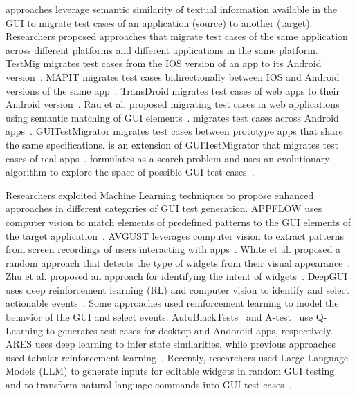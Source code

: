 \smallskip 
\testreuse approaches leverage semantic similarity of textual information available in the GUI to migrate test cases of an application (source) to another (target).
Researchers proposed approaches that migrate test cases of the same application across different platforms and different applications in the same platform. 
TestMig migrates test cases from the IOS version of an app to its Android version~\cite{Qin:testmig:ISSTA:2019}.
MAPIT migrates test cases bidirectionally between IOS and Android versions of the same app~\cite{talebipour:MAPIT:ASE:2021}.
TransDroid migrates test cases of web apps to their Android version~\cite{lin:TransDroid:ICST:2022}.
 Rau et al. proposed migrating test cases in web applications  using semantic matching of GUI elements~\cite{rau:efficent:icse:2018}.
 \craftdroid migrates test cases across Android apps~\cite{lin:craftdroid:ASE:2019}.
GUITestMigrator migrates test cases between prototype apps that share the same specifications.
\atm is an extension of GUITestMigrator that migrates test cases of real apps~\cite{Behrang:migration:ICSE:2018}.
 \adaptdroid formulates \testreuse as a search problem and uses an evolutionary algorithm to explore the space of possible GUI test cases~\cite{Mariani:Adaptdroid:AST:2021}.
 
 
\smallskip 
Researchers exploited Machine Learning techniques to propose enhanced approaches in different categories of GUI test generation.
APPFLOW uses computer vision to match elements of predefined patterns to the GUI elements of the target application~\cite{Hu:appflow:FSE:2018}.
AVGUST leverages computer vision to extract patterns from screen recordings of users interacting with apps~\cite{zhao:Avgust:FSE:2022}.
White et al. proposed a random approach that detects the type of widgets from their visual appearance~\cite{white:WidgetDetection:ISSTA:2019}.
Zhu et al. proposed an approach for identifying the intent of widgets~\cite{zhu2021widgetrecog}.
DeepGUI uses deep reinforcement learning (RL) and computer vision to identify and select actionable events~\cite{YazdaniBanafsheDaragh:DEEPGUI:ASE:2021}.
Some approaches used reinforcement learning to model the behavior of the GUI and select events.
AutoBlackTests~\cite{Mariani:ABT:STVR:2014} and A-test~\cite{Vuong:RLTest:A-Test:2018} use Q-Learning to generates test cases  for desktop and Andoroid apps, respectively.
ARES uses deep learning to infer state similarities, while previous approaches used tabular reinforcement learning~\cite{Romdhana:ARES:TOSEM:2022}.
Recently, researchers used Large Language Models (LLM) to generate inputs for editable widgets in random GUI testing ~\cite{liu:GUIInputLLM:ICSE:2023} and to transform natural language commands into GUI test cases~\cite{Zimmermann:GPT3GUITest:2023:ICSTW}. 

